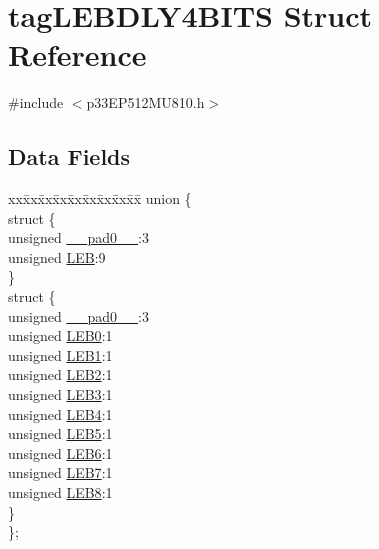 \hypertarget{structtag_l_e_b_d_l_y4_b_i_t_s}{}\section{tag\+L\+E\+B\+D\+L\+Y4\+B\+I\+TS Struct Reference}
\label{structtag_l_e_b_d_l_y4_b_i_t_s}


{\ttfamily \#include $<$p33\+E\+P512\+M\+U810.\+h$>$}

\subsection*{Data Fields}
\begin{DoxyCompactItemize}
\item 
\begin{tabbing}
xx\=xx\=xx\=xx\=xx\=xx\=xx\=xx\=xx\=\kill
union \{\\
\>struct \{\\
\>\>unsigned \hyperlink{structtag_l_e_b_d_l_y4_b_i_t_s_adf71f3d8410c1f1dbbc96680a92c49af}{\_\_pad0\_\_}:3\\
\>\>unsigned \hyperlink{structtag_l_e_b_d_l_y4_b_i_t_s_a850b96052b17c96a4012653317c39bdf}{LEB}:9\\
\>\} \\
\>struct \{\\
\>\>unsigned \hyperlink{structtag_l_e_b_d_l_y4_b_i_t_s_adf71f3d8410c1f1dbbc96680a92c49af}{\_\_pad0\_\_}:3\\
\>\>unsigned \hyperlink{structtag_l_e_b_d_l_y4_b_i_t_s_a1710dcadd784ef12033a5cf8121accb3}{LEB0}:1\\
\>\>unsigned \hyperlink{structtag_l_e_b_d_l_y4_b_i_t_s_ab0505c0f812822c77a65e8bfe2db4f40}{LEB1}:1\\
\>\>unsigned \hyperlink{structtag_l_e_b_d_l_y4_b_i_t_s_a120826056ccccfac30aa9e8a0569ae88}{LEB2}:1\\
\>\>unsigned \hyperlink{structtag_l_e_b_d_l_y4_b_i_t_s_a7b918c1b7306fd3ff86ab19bcb5365a4}{LEB3}:1\\
\>\>unsigned \hyperlink{structtag_l_e_b_d_l_y4_b_i_t_s_a5fbd877152dfc4182c4456b4224ec747}{LEB4}:1\\
\>\>unsigned \hyperlink{structtag_l_e_b_d_l_y4_b_i_t_s_a4371c46a68a319773f493c25667df943}{LEB5}:1\\
\>\>unsigned \hyperlink{structtag_l_e_b_d_l_y4_b_i_t_s_a2b8fccc4fb31a13c611cfb0d1c53aff0}{LEB6}:1\\
\>\>unsigned \hyperlink{structtag_l_e_b_d_l_y4_b_i_t_s_aa76d586b04119d8459718019ddd964ef}{LEB7}:1\\
\>\>unsigned \hyperlink{structtag_l_e_b_d_l_y4_b_i_t_s_a9b22b47001301c6ae00c3eea0f385091}{LEB8}:1\\
\>\} \\
\}; \\

\end{tabbing}\end{DoxyCompactItemize}


